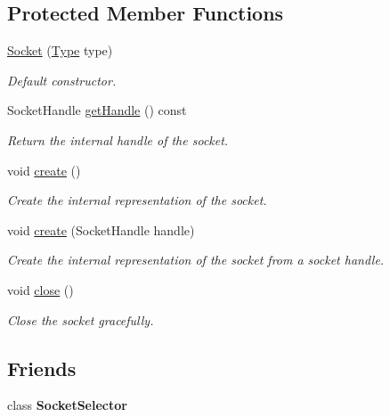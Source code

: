 \subsection*{Protected Member Functions}
\begin{DoxyCompactItemize}
\item 
\hyperlink{classsf_1_1Socket_a80ffb47ec0bafc83af019055d3e6a303}{Socket} (\hyperlink{classsf_1_1Socket_a5d3ff44e56e68f02816bb0fabc34adf8}{Type} type)
\begin{DoxyCompactList}\small\item\em Default constructor. \end{DoxyCompactList}\item 
Socket\-Handle \hyperlink{classsf_1_1Socket_ac0c63b13e61da8294bf54e888e97f9a3}{get\-Handle} () const 
\begin{DoxyCompactList}\small\item\em Return the internal handle of the socket. \end{DoxyCompactList}\item 
void \hyperlink{classsf_1_1Socket_aafbe140f4b1921e0d19e88cf7a61dcbc}{create} ()
\begin{DoxyCompactList}\small\item\em Create the internal representation of the socket. \end{DoxyCompactList}\item 
void \hyperlink{classsf_1_1Socket_af1dd898f7aa3ead7ff7b2d1c20e97781}{create} (Socket\-Handle handle)
\begin{DoxyCompactList}\small\item\em Create the internal representation of the socket from a socket handle. \end{DoxyCompactList}\item 
void \hyperlink{classsf_1_1Socket_a71f2f5c2aa99e01cafe824fee4c573be}{close} ()
\begin{DoxyCompactList}\small\item\em Close the socket gracefully. \end{DoxyCompactList}\end{DoxyCompactItemize}
\subsection*{Friends}
\begin{DoxyCompactItemize}
\item 
\hypertarget{classsf_1_1Socket_a23fafd48278ea4f8f9c25f1f0f43693c}{class {\bfseries Socket\-Selector}}\label{classsf_1_1Socket_a23fafd48278ea4f8f9c25f1f0f43693c}

\end{DoxyCompactItemize}


